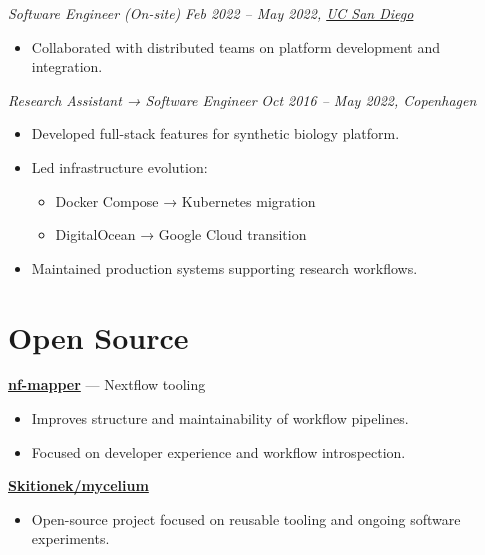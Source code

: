 \documentclass[11pt,a4paper]{article}
\begin{document}
\vspace{4pt}

\textit{Software Engineer (On-site)} \hfill \textit{Feb 2022 -- May 2022, \href{https://ucsd.edu}{UC San Diego}}
\begin{itemize}
    \item Collaborated with distributed teams on platform development and integration.
\end{itemize}

\vspace{4pt}

\textit{Research Assistant → Software Engineer} \hfill \textit{Oct 2016 -- May 2022, Copenhagen}
\begin{itemize}
    \item Developed full-stack features for synthetic biology platform.
    \item Led infrastructure evolution:
    \begin{itemize}
        \item Docker Compose → Kubernetes migration
        \item DigitalOcean → Google Cloud transition
    \end{itemize}
    \item Maintained production systems supporting research workflows.
\end{itemize}

\section*{Open Source}

\textbf{\href{https://github.com/Skitionek/nf-mapper}{nf-mapper}} — Nextflow tooling
\begin{itemize}
    \item Improves structure and maintainability of workflow pipelines.
    \item Focused on developer experience and workflow introspection.
\end{itemize}

\vspace{4pt}

\textbf{\href{https://github.com/Skitionek/mycelium}{Skitionek/mycelium}}
\begin{itemize}
    \item Open-source project focused on reusable tooling and ongoing software experiments.
\end{itemize}

\vspace{4pt}
\end{document}
